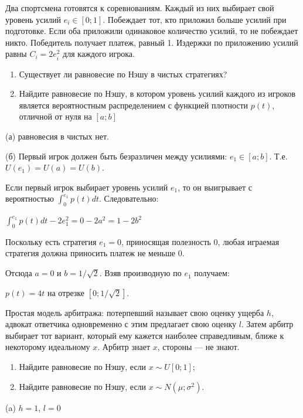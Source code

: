 \begin{problem}

Два спортсмена готовятся к соревнованиям. Каждый из них выбирает
свой уровень усилий $e_{i}\in[0;1]$. Побеждает тот, кто приложил
больше усилий при подготовке. Если оба приложили одинаковое
количество усилий, то не побеждает никто. Победитель получает
платеж, равный 1. Издержки по приложению усилий равны
$C_{i}=2e_{i}^{2}$ для каждого игрока. \par
\begin{enumerate}
\item Существует ли равновесие по Нэшу в чистых стратегиях? \par
\item Найдите равновесие по Нэшу, в котором уровень усилий каждого из
игроков является
вероятностным
распределением с
функцией плотности $p(t)$, отличной от нуля на $[a;b]$
\end{enumerate}


\begin{sol}

(а) равновесия в чистых нет. \par
(б) Первый игрок должен быть безразличен между усилиями:
$e_{1}\in [a;b]$. Т.е. $U(e_{1})=U(a)=U(b)$. \par
Если первый игрок выбирает уровень усилий $e_{1}$, то он
выигрывает с вероятностью $\int_{0}^{e_{1}}p(t)dt$.
Следовательно: \par
$\int_{0}^{e_{1}}p(t)dt-2e_{1}^{2}=0-2a^{2}=1-2b^{2}$ \par
Поскольку есть стратегия $e_{1}=0$, приносящая полезность 0, любая
играемая стратегия должна приносить платеж не меньше 0. \par
Отсюда $a=0$ и $b=1/\sqrt{2}$.
Взяв производную по $e_{1}$ получаем: \par
$p(t)=4t$ на отрезке $[0;1/\sqrt{2}]$.
\end{sol}
\end{problem}


\begin{problem}
\begin{source}
\cite[1.2C]{gibbons:ae}
\end{source}
Простая модель арбитража: потерпевший называет свою оценку ущерба  $h$, адвокат ответчика одновременно с этим предлагает свою оценку  $l$. Затем арбитр выбирает тот вариант, который ему кажется наиболее справедливым, ближе к некоторому идеальному  $x$. Арбитр знает  $x$, стороны — не знают.\par
\begin{enumerate}
\item Найдите равновесие по Нэшу, если  $x\sim U\left[0;1\right]$;\par
\item Найдите равновесие по Нэшу, если  $x\sim N\left(\mu ;\sigma ^{2} \right).$
\end{enumerate}

\begin{sol}
(a) $h=1$, $l=0$
\end{sol}
\end{problem}


